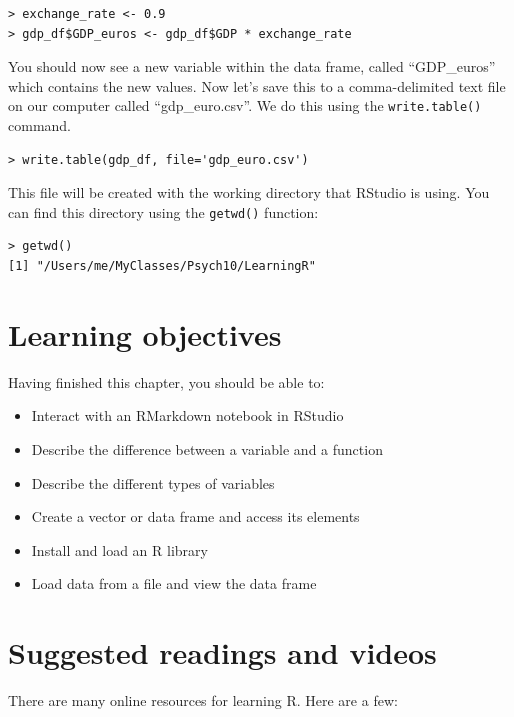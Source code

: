 \documentclass[12pt,]{book}
\providecommand{\tightlist}{%
  \setlength{\itemsep}{0pt}\setlength{\parskip}{0pt}}
\begin{document}
\begin{verbatim}
> exchange_rate <- 0.9
> gdp_df$GDP_euros <- gdp_df$GDP * exchange_rate
\end{verbatim}

You should now see a new variable within the data frame, called ``GDP\_euros'' which contains the new values. Now let's save this to a comma-delimited text file on our computer called ``gdp\_euro.csv''.
We do this using the \texttt{write.table()} command.

\begin{verbatim}
> write.table(gdp_df, file='gdp_euro.csv')
\end{verbatim}

This file will be created with the working directory that RStudio is using. You can find this directory using the \texttt{getwd()} function:

\begin{verbatim}
> getwd()
[1] "/Users/me/MyClasses/Psych10/LearningR"
\end{verbatim}

\hypertarget{learning-objectives}{%
\section{Learning objectives}\label{learning-objectives}}

Having finished this chapter, you should be able to:

\begin{itemize}
\tightlist
\item
  Interact with an RMarkdown notebook in RStudio
\item
  Describe the difference between a variable and a function
\item
  Describe the different types of variables
\item
  Create a vector or data frame and access its elements
\item
  Install and load an R library
\item
  Load data from a file and view the data frame
\end{itemize}

\hypertarget{suggested-readings-and-videos}{%
\section{Suggested readings and videos}\label{suggested-readings-and-videos}}

There are many online resources for learning R. Here are a few:
\end{document}
